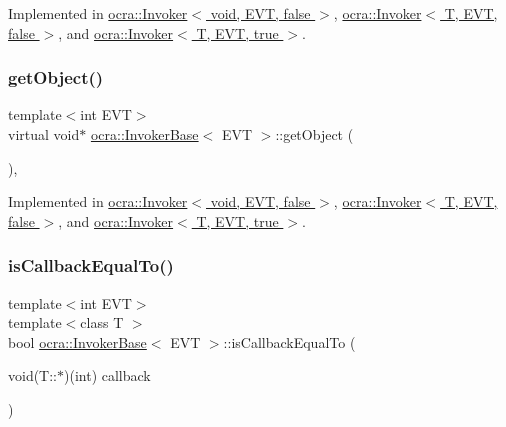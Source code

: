 Implemented in \hyperlink{classocra_1_1Invoker_3_01void_00_01EVT_00_01false_01_4_a28f6e1841ccdb09d1bfefbb529d51f79}{ocra\+::\+Invoker$<$ void, E\+V\+T, false $>$}, \hyperlink{classocra_1_1Invoker_3_01T_00_01EVT_00_01false_01_4_a459bd95f3eae2d06b9167fd98c1c7e22}{ocra\+::\+Invoker$<$ T, E\+V\+T, false $>$}, and \hyperlink{classocra_1_1Invoker_3_01T_00_01EVT_00_01true_01_4_a902cb0e1084dc60929920a56631c8586}{ocra\+::\+Invoker$<$ T, E\+V\+T, true $>$}.

\hypertarget{classocra_1_1InvokerBase_a90d81926209cb3119933412f742bc245}{}\label{classocra_1_1InvokerBase_a90d81926209cb3119933412f742bc245} 
\subsubsection{\texorpdfstring{get\+Object()}{getObject()}}
{\footnotesize\ttfamily template$<$int E\+VT$>$ \\
virtual void$\ast$ \hyperlink{classocra_1_1InvokerBase}{ocra\+::\+Invoker\+Base}$<$ E\+VT $>$\+::get\+Object (\begin{DoxyParamCaption}{ }\end{DoxyParamCaption})\hspace{0.3cm}{\ttfamily [protected]}, {}}



Implemented in \hyperlink{classocra_1_1Invoker_3_01void_00_01EVT_00_01false_01_4_a2d32f4dcaca9ae526b89e28cf2a3fc70}{ocra\+::\+Invoker$<$ void, E\+V\+T, false $>$}, \hyperlink{classocra_1_1Invoker_3_01T_00_01EVT_00_01false_01_4_ad77a4342ddfd1b1e1387065276c54246}{ocra\+::\+Invoker$<$ T, E\+V\+T, false $>$}, and \hyperlink{classocra_1_1Invoker_3_01T_00_01EVT_00_01true_01_4_ab187a80065f38c9a650e0a5b35185153}{ocra\+::\+Invoker$<$ T, E\+V\+T, true $>$}.

\hypertarget{classocra_1_1InvokerBase_a4876ec9f3321e19fda7eb7f40befdf8e}{}\label{classocra_1_1InvokerBase_a4876ec9f3321e19fda7eb7f40befdf8e} 
\subsubsection{\texorpdfstring{is\+Callback\+Equal\+To()}{isCallbackEqualTo()}\hspace{0.1cm}{\footnotesize\ttfamily [1/2]}}
{\footnotesize\ttfamily template$<$int E\+VT$>$ \\
template$<$class T $>$ \\
bool \hyperlink{classocra_1_1InvokerBase}{ocra\+::\+Invoker\+Base}$<$ E\+VT $>$\+::is\+Callback\+Equal\+To (\begin{DoxyParamCaption}\item[{void(T\+::$\ast$)(int)}]{callback }\end{DoxyParamCaption})\hspace{0.3cm}{\ttfamily [inline]}}



